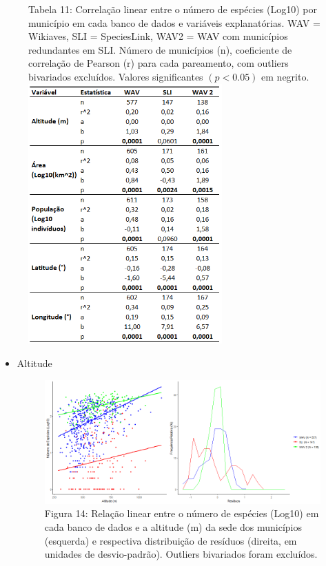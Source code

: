 \begin{itemize}
\begin{figure}[h!]
\centering
{\scriptsize Tabela 11: Correlação linear entre o número de espécies (Log10) por município em cada banco de dados e variáveis explanatórias. WAV = Wikiaves, SLI = SpeciesLink, WAV2 = WAV com municípios redundantes em SLI. Número de municípios (n), coeficiente de correlação de Pearson (r) para cada pareamento, com outliers bivariados excluídos. Valores significantes $(p < 0.05)$ em negrito.}
\\
\includegraphics[height = 10cm]{Tabelas/11.png}
\end{figure}

\begin{itemize}


\item Altitude

\begin{figure}[h!]
\centering
\includegraphics[width = 15cm]{Imagens/32113.png}
\\{\scriptsize Figura 14: Relação linear entre o número de espécies (Log10) em cada banco de dados e a altitude (m) da sede dos municípios (esquerda) e respectiva distribuição de resíduos (direita, em unidades de desvio-padrão). Outliers bivariados foram excluídos.}
\end{figure}




\end{itemize}
\end{itemize}
